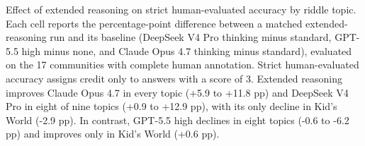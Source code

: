 \caption{Effect of extended reasoning on strict human-evaluated accuracy by riddle topic. Each cell reports the percentage-point difference between a matched extended-reasoning run and its baseline (DeepSeek V4 Pro thinking minus standard, GPT-5.5 high minus none, and Claude Opus 4.7 thinking minus standard), evaluated on the 17 communities with complete human annotation. Strict human-evaluated accuracy assigns credit only to answers with a score of 3. Extended reasoning improves Claude Opus 4.7 in every topic (+5.9 to +11.8 pp) and DeepSeek V4 Pro in eight of nine topics (+0.9 to +12.9 pp), with its only decline in Kid's World (-2.9 pp). In contrast, GPT-5.5 high declines in eight topics (-0.6 to -6.2 pp) and improves only in Kid's World (+0.6 pp).}
\label{fig:reasoning-mode-delta-by-topic}
